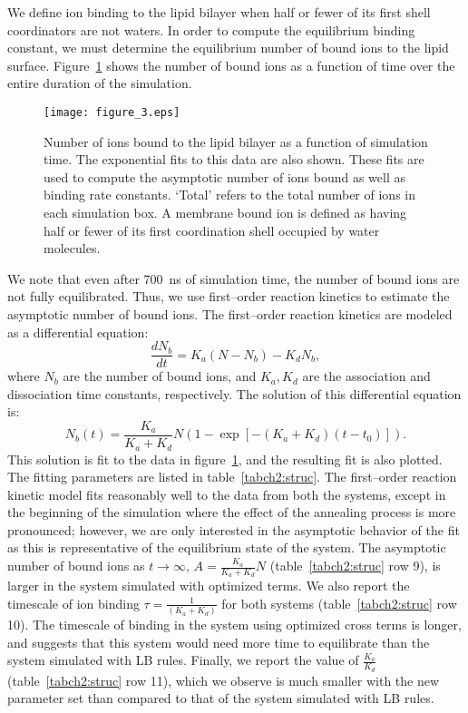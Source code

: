 We define ion binding to the lipid bilayer when half or fewer
of its first shell coordinators are not waters. 
In order to compute the equilibrium binding constant, 
we must determine the equilibrium number of bound ions to the lipid surface. 
Figure~\ref{figch2:ioncoodcount} shows the number of bound ions as a
function of time over the entire duration of the simulation. 
\begin{figure}[h!tb]
    \texttt{[image: figure\_3.eps]}
    \caption[Number of ions bound to the lipid bilayer]{Number of ions bound to the lipid bilayer as a function of simulation time. 
The exponential fits to this data are also shown. These fits are used to compute the asymptotic
number of ions bound as well as binding rate constants.
`Total' refers to the total number of ions in each simulation box.
A membrane bound ion is defined as having half or fewer of its first coordination shell
occupied by water molecules. }
    \label{figch2:ioncoodcount}
\end{figure}
We note that even after 700~ns of simulation time, the number of bound ions
are not fully equilibrated. 
Thus, we use first--order reaction kinetics to
estimate the asymptotic number of bound ions.  
The first--order reaction kinetics are modeled as a differential equation:
\begin{equation}
    \frac{dN_b}{dt}=K_a \left(N-N_b\right)- K_d N_b,
\end{equation}
where $N_b$ are the number of bound ions, and $K_a,K_d$ are the association and dissociation
time constants, respectively.
The solution of this differential equation is:
\begin{equation}
    N_b(t)= \frac{K_{a}}{K_{a}+K_{d}} N
    \left(1-\exp\left[-\left(K_{a}+K_{d}\right)\left(t-t_0\right)\right]\right).
    \label{eq:ioncoodnumfit}
\end{equation}
This solution is fit to the data in figure~\ref{figch2:ioncoodcount}, 
and the resulting fit is also plotted. 
The fitting parameters are listed in table~\ref{tabch2:struc}.
The first--order reaction kinetic model fits reasonably well to the 
data from both the systems, except in the beginning of
the simulation where the effect of the annealing process is more pronounced; 
however, we are only interested in the asymptotic
behavior of the fit as this is representative of the equilibrium state of the system. 
The asymptotic number of bound ions as $t\to\infty$, $A=\frac{K_{a}}{K_{a}+K_{d}} N$ 
(table~\ref{tabch2:struc} row 9), is larger in the system simulated with optimized terms.
We also report the timescale of ion binding $\tau=\frac{1}{\left(K_{a}+K_{d}\right)}$
for both systems (table~\ref{tabch2:struc} row 10). 
The timescale of binding in the system using optimized  cross terms is longer, 
and suggests that this system would need more time to equilibrate than the system simulated with LB rules.
Finally, we report the value of $\frac{K_a}{K_d}$ 
(table~\ref{tabch2:struc} row 11), which
we observe is much smaller with the new parameter set than compared to that
of the system simulated with LB rules.

